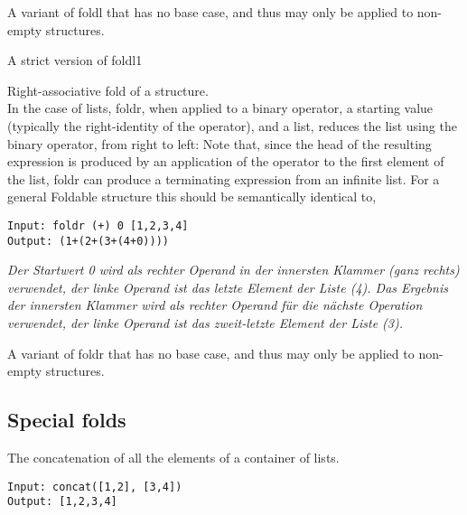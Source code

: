 A variant of foldl that has no base case, and thus may only be applied to non-empty structures.

A strict version of foldl1

Right-associative fold of a structure.\\
In the case of lists, foldr, when applied to a binary operator, a starting value (typically the right-identity of the operator), and a list, reduces the list using the binary operator, from right to left:
Note that, since the head of the resulting expression is produced by an application of the operator to the first element of the list, foldr can produce a terminating expression from an infinite list.
For a general Foldable structure this should be semantically identical to,
\example
\begin{lstlisting}
Input: foldr (+) 0 [1,2,3,4] 
Output: (1+(2+(3+(4+0))))
\end{lstlisting}
\textit{Der Startwert 0 wird als rechter Operand in der innersten Klammer (ganz rechts) verwendet, der linke Operand ist das letzte Element der Liste (4). Das Ergebnis der innersten Klammer wird als rechter Operand für die nächste Operation verwendet, der linke Operand ist das zweit-letzte Element der Liste (3).}

A variant of foldr that has no base case, and thus may only be applied to non-empty structures.

\newpage
\subsection{Special folds}
The concatenation of all the elements of a container of lists.
\example
\begin{lstlisting}
Input: concat([1,2], [3,4]) 
Output: [1,2,3,4]
\end{lstlisting}

